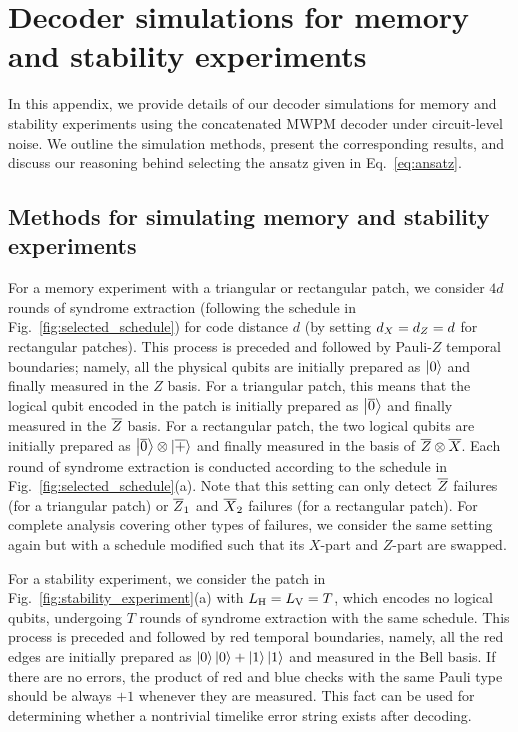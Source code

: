 \documentclass[
 prx,
 reprint,
 superscriptaddress,
 longbibliography,
 dvipsnames
]{revtex4-2}
\begin{document}
\section{Decoder simulations for memory and stability experiments \label{app:decoder_simulations}}

In this appendix, we provide details of our decoder simulations for memory and stability experiments using the concatenated MWPM decoder under circuit-level noise. 
We outline the simulation methods, present the corresponding results, and discuss our reasoning behind selecting the ansatz given in Eq.~\eqref{eq:ansatz}.

\subsection{Methods for simulating memory and stability experiments \label{subsec:decoder_simulation_methods}}

For a memory experiment with a triangular or rectangular patch, we consider $4d$ rounds of syndrome extraction (following the schedule in Fig.~\ref{fig:selected_schedule}) for code distance $d$ (by setting ${d_X} = {d_Z} = d$ for rectangular patches).
This process is preceded and followed by Pauli-$Z$ temporal boundaries; namely, all the physical qubits are initially prepared as $\ket{0}$ and finally measured in the $Z$ basis.
For a triangular patch, this means that the logical qubit encoded in the patch is initially prepared as $\ket{\overline{0}}$ and finally measured in the $\overline{Z}$ basis.
For a rectangular patch, the two logical qubits are initially prepared as $\ket{\overline{0}} \otimes \ket{\overline{+}}$ and finally measured in the basis of $\overline{Z} \otimes \overline{X}$.
Each round of syndrome extraction is conducted according to the schedule in Fig.~\ref{fig:selected_schedule}(a).
Note that this setting can only detect $\overline{Z}$ failures (for a triangular patch) or $\overline{Z}_1$ and $\overline{X}_2$ failures (for a rectangular patch).
For complete analysis covering other types of failures, we consider the same setting again but with a schedule modified such that its $X$-part and $Z$-part are swapped.

For a stability experiment, we consider the patch in Fig.~\ref{fig:stability_experiment}(a) with $L_{\mathrm{H}} = L_{\mathrm{V}} = T$, which encodes no logical qubits, undergoing $T$ rounds of syndrome extraction with the same schedule.
This process is preceded and followed by red temporal boundaries, namely, all the red edges are initially prepared as $\ket{0}\ket{0} + \ket{1}\ket{1}$ and measured in the Bell basis.
If there are no errors, the product of red and blue checks with the same Pauli type should be always $+1$ whenever they are measured.
This fact can be used for determining whether a nontrivial timelike error string exists after decoding.
\end{document}
